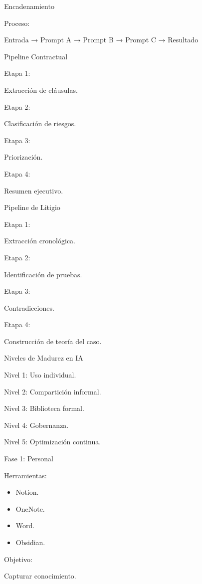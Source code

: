 \documentclass[aspectratio=169]{beamer}
\begin{document}
\begin{frame}{Encadenamiento}


Proceso:

Entrada → Prompt A → Prompt B → Prompt C → Resultado

\end{frame}

\begin{frame}{Pipeline Contractual}


Etapa 1:

Extracción de cláusulas.

Etapa 2:

Clasificación de riesgos.

Etapa 3:

Priorización.

Etapa 4:

Resumen ejecutivo.

\end{frame}

\begin{frame}{Pipeline de Litigio}


Etapa 1:

Extracción cronológica.

Etapa 2:

Identificación de pruebas.

Etapa 3:

Contradicciones.

Etapa 4:

Construcción de teoría del caso.

\end{frame}

\begin{frame}{Niveles de Madurez en IA}


Nivel 1: Uso individual.

Nivel 2: Compartición informal.

Nivel 3: Biblioteca formal.

Nivel 4: Gobernanza.

Nivel 5: Optimización continua.

\end{frame}

\begin{frame}{Fase 1: Personal}


Herramientas:

\begin{itemize}
  \item Notion.
  \item OneNote.
  \item Word.
  \item Obsidian.
\end{itemize}
Objetivo:

Capturar conocimiento.

\end{frame}
\end{document}
